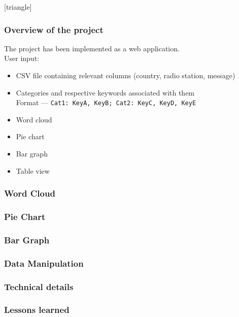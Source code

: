 \documentclass{beamer}
\begin{document}
\begin{frame}
[triangle]
\frametitle{Overview of the project}
The project has been implemented as a web application.\\
\pause
User input:
\pause
\begin{itemize}[<+->]
\item CSV file containing relevant columns (country, radio station, message)
\item Categories and respective keywords associated with them\\
Format --- {\tt Cat1:\ KeyA, KeyB; Cat2:\ KeyC, KeyD, KeyE}
\end{itemize}
\begin{itemize}[<+->]
\item Word cloud
\item Pie chart
\item Bar graph
\item Table view
\end{itemize}
\end{frame}

\begin{frame}
\frametitle{Word Cloud}
\end{frame}

\begin{frame}
\frametitle{Pie Chart}
\end{frame}

\begin{frame}
\frametitle{Bar Graph}
\end{frame}

\begin{frame}
\frametitle{Data Manipulation}
\end{frame}

\begin{frame}
\frametitle{Technical details}
\end{frame}

\begin{frame}
\frametitle{Lessons learned}
\end{frame}
\end{document}
